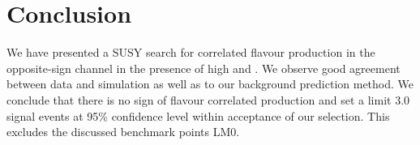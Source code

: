 \section{Conclusion}

We have presented a SUSY search for correlated flavour production in the opposite-sign channel
in the presence of high \HT and \MET.
We observe good agreement between data and simulation as well as to our background prediction
method.
We conclude that there is no sign of flavour correlated production and set a limit $3.0$
signal events at 95\% confidence level within acceptance of our selection. 
This excludes the discussed benchmark points LM0.
